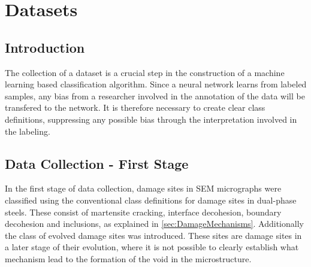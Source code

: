 \chapter{Datasets}


\section{Introduction}

The collection of a dataset is a crucial step in the construction of a machine learning based classification algorithm. Since a neural network learns from labeled samples, any bias from a researcher involved in the annotation of the data will be transfered to the network. It is therefore necessary to create clear class definitions, suppressing any possible bias through the interpretation involved in the labeling. \\




\section{Data Collection - First Stage}
In the first stage of data collection, damage sites in SEM micrographs were classified using the conventional class definitions for damage sites in dual-phase steels. These consist of martensite cracking, interface decohesion, boundary decohesion and inclusions, as explained in \ref{sec:DamageMechanisms}. Additionally the class of evolved damage sites was introduced. These sites are damage sites in a later stage of their evolution, where it is not possible to clearly establish what mechanism lead to the formation of the void in the microstructure. \\



